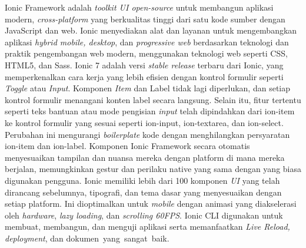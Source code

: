\documentclass[a4paper,twoside]{article}
\begin{document}

Ionic Framework adalah \textit{toolkit UI open-source} untuk membangun aplikasi modern, \textit{cross-platform} yang berkualitas tinggi dari satu kode sumber dengan JavaScript dan web. Ionic menyediakan alat dan layanan untuk mengembangkan aplikasi\textit{ hybrid mobile, desktop}, dan \textit{progressive web} berdasarkan teknologi dan praktik pengembangan web modern, menggunakan teknologi web seperti CSS, HTML5, dan Sass. Ionic 7 adalah versi \textit{stable release} terbaru dari Ionic, yang memperkenalkan cara kerja yang lebih efisien dengan kontrol formulir seperti \textit{Toggle} atau \textit{Input}. Komponen \textit{Item} dan Label tidak lagi diperlukan, dan setiap kontrol formulir menangani konten label secara langsung. Selain itu, fitur tertentu seperti teks bantuan atau mode pengisian \textit{input} telah dipindahkan dari ion-item ke kontrol formulir yang sesuai seperti ion-input, ion-textarea, dan ion-select. Perubahan ini mengurangi \textit{boilerplate} kode dengan menghilangkan persyaratan ion-item dan ion-label. Komponen Ionic Framework secara otomatis menyesuaikan tampilan dan nuansa mereka dengan platform di mana mereka berjalan, memungkinkan gestur dan perilaku native yang sama dengan yang biasa digunakan pengguna. Ionic memiliki lebih dari 100 komponen \textit{UI} yang telah dirancang sebelumnya, tipografi, dan tema dasar yang menyesuaikan dengan setiap platform. Ini dioptimalkan untuk \textit{mobile} dengan animasi yang diakselerasi oleh \textit{hardware}, \textit{lazy loading}, dan \textit{scrolling 60FPS}. Ionic CLI digunakan untuk membuat, membangun, dan menguji aplikasi serta memanfaatkan\textit{ Live Reload, deployment}, dan dokumen~yang~sangat~baik.
\end{document}
